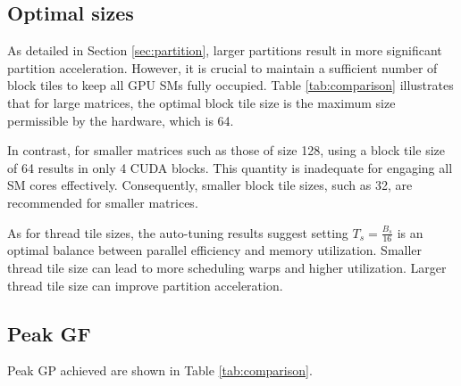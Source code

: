 \documentclass{article}
\begin{document}
\subsection{Optimal sizes}
As detailed in Section \ref{sec:partition}, 
larger partitions result in more significant partition acceleration.  
However, it is crucial to maintain a sufficient number of block tiles 
to keep all GPU SMs fully occupied.
Table \ref{tab:comparison} illustrates that 
for large matrices, the optimal block tile size is the maximum size permissible by the hardware, which is 64. 

In contrast, for smaller matrices such as those of size 128, 
using a block tile size of 64 results in only 4 CUDA blocks. 
This quantity is inadequate for engaging all SM cores effectively. 
Consequently, smaller block tile sizes, such as 32, 
are recommended for smaller matrices.

As for thread tile sizes, 
the auto-tuning results suggest setting $T_s = \frac{B_s}{16}$ 
is an optimal balance between parallel efficiency and memory utilization. 
Smaller thread tile size can lead to more scheduling warps and higher utilization.
Larger thread tile size can improve partition acceleration.

\subsection{Peak GF}
Peak GP achieved are shown in Table \ref{tab:comparison}.
\end{document}
